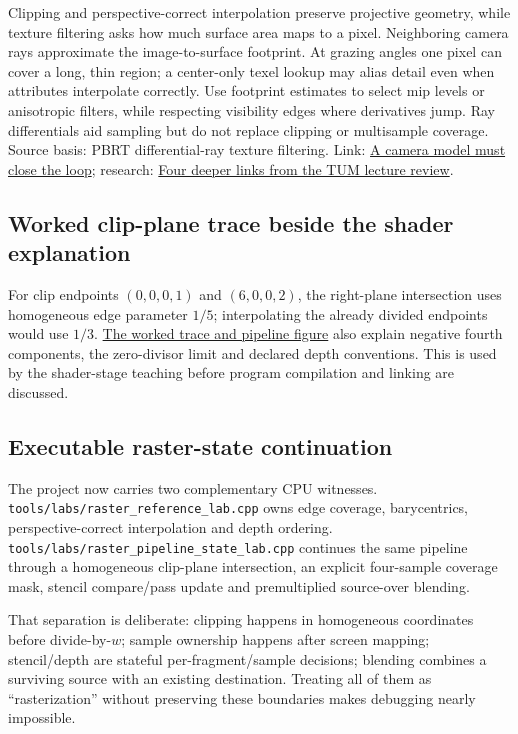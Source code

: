 Clipping and perspective-correct interpolation preserve projective geometry, while texture filtering asks how much surface area maps to a pixel. Neighboring camera rays approximate the image-to-surface footprint. At grazing angles one pixel can cover a long, thin region; a center-only texel lookup may alias detail even when attributes interpolate correctly. Use footprint estimates to select mip levels or anisotropic filters, while respecting visibility edges where derivatives jump. Ray differentials aid sampling but do not replace clipping or multisample coverage. Source basis: PBRT differential-ray texture filtering. Link: \href{Continuous\%20Notes/Computing\%20Foundations\%20-\%20From\%20Bits\%20to\%20C++\%20and\%20Systems\%20APIs\#A\%20camera\%20model\%20must\%20close\%20the\%20loop}{A camera model must close the loop}; research: \href{Continuous\%20Notes/Computing\%20Foundations\%20-\%20From\%20Bits\%20to\%20C++\%20and\%20Systems\%20APIs\#Four\%20deeper\%20links\%20from\%20the\%20TUM\%20lecture\%20review}{Four deeper links from the TUM lecture review}.

\subsection{Worked clip-plane trace beside the shader explanation}\label{worked-clip-plane-trace-beside-the-shader-explanation}

For clip endpoints \((0,0,0,1)\) and \((6,0,0,2)\), the right-plane intersection uses homogeneous edge parameter \(1/5\); interpolating the already divided endpoints would use \(1/3\). \href{Continuous\%20Notes/Game\%20Engine\%20-\%20From\%20First\%20Frame\%20to\%20Living\%20Worlds\#Clip\%20coordinates\%20are\%20not\%20normalized\%20device\%20coordinates}{The worked trace and pipeline figure} also explain negative fourth components, the zero-divisor limit and declared depth conventions. This is used by the shader-stage teaching before program compilation and linking are discussed.

\subsection{Executable raster-state continuation}\label{executable-raster-state-continuation}

The project now carries two complementary CPU witnesses. \texttt{tools/labs/raster\_reference\_lab.cpp} owns edge coverage, barycentrics, perspective-correct interpolation and depth ordering. \texttt{tools/labs/raster\_pipeline\_state\_lab.cpp} continues the same pipeline through a homogeneous clip-plane intersection, an explicit four-sample coverage mask, stencil compare/pass update and premultiplied source-over blending.

That separation is deliberate: clipping happens in homogeneous coordinates before divide-by-\(w\); sample ownership happens after screen mapping; stencil/depth are stateful per-fragment/sample decisions; blending combines a surviving source with an existing destination. Treating all of them as ``rasterization'' without preserving these boundaries makes debugging nearly impossible.
